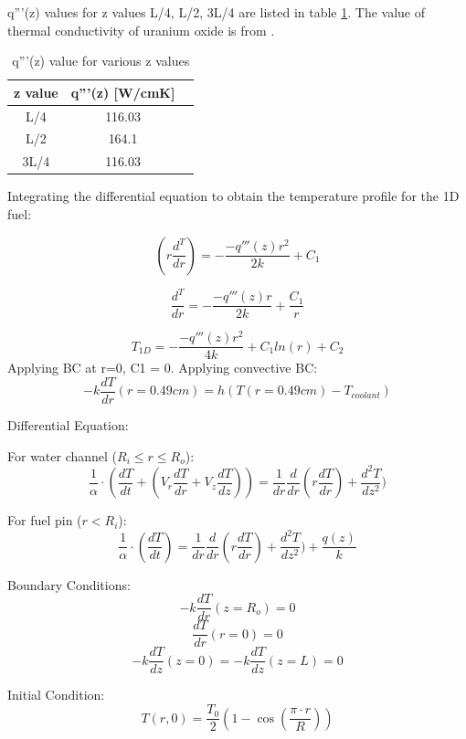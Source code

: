 \documentclass[12pt,letterpaper]{article}
\begin{document}
q'''(z) values for z values L/4, L/2, 3L/4 are listed in table \ref{tab:q_vol}.
The value of thermal conductivity of uranium oxide is from \cite{ronchi_thermal_1999}.

\begin{table}[h]
     \centering
    \begin{tabular}{ccc}
       \hline
       z value & q'''(z) [W/cmK]  \\
       \hline
       L/4 & 116.03 \\
       L/2 & 164.1 \\
       3L/4 & 116.03 \\
       \hline
    \end{tabular}
    \caption {q'''(z) value for various z values}
    \label{tab:q_vol}
\end{table}

Integrating the differential equation to obtain the temperature profile for the
1D fuel:


\[ (r \frac{d^T}{dr}) = -\frac{-q'''(z)r^2}{2k} + C_1 \]

\[ \frac{d^T}{dr} = -\frac{-q'''(z)r}{2k} + \frac{C_1}{r} \]

\[ T_{1D} = -\frac{-q'''(z)r^2}{4k} + C_1 ln(r) + C_2 \]
Applying BC at r=0, C1 = 0.
Applying convective BC:
\[ -k \frac{dT}{dr}(r= 0.49 cm) = h (T(r = 0.49 cm ) - T_{coolant})\]



\pagebreak
Differential Equation:

For water channel ($R_i \leq r \leq R_o$):
\[\frac{1}{\alpha} \cdot (\frac{dT}{dt} + (V_r \frac{dT}{dr} + V_z \frac{dT}{dz})) =
  \frac{1}{dr} \frac{d}{dr} (r \frac{dT}{dr}) + \frac{d^2T}{dz^2})\]

For fuel pin ($r < R_i$):
\[\frac{1}{\alpha} \cdot (\frac{dT}{dt}) =
  \frac{1}{dr} \frac{d}{dr} (r \frac{dT}{dr}) + \frac{d^2T}{dz^2}) + \frac{q(z)}{k}\]

Boundary Conditions:
\[-k \frac{dT}{dr}(z=R_o) = 0 \]
\[\frac{dT}{dr}(r=0) = 0\]
\[-k \frac{dT}{dz}(z=0) = -k \frac{dT}{dz}(z=L) = 0 \]
 

Initial Condition:
\[T(r,0) = \frac{T_0}{2} (1-\cos{(\frac{\pi \cdot r}{R})}) \]
\end{document}
